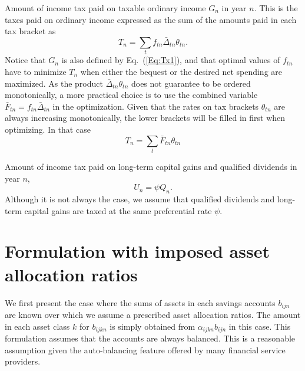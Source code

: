 \documentclass{report}[fleqn,11pt]
\begin{document}
\begin{description}[leftmargin=4em,style=multiline]
\item [$T_n$]
	Amount of income tax paid on taxable ordinary income $G_n$ in year $n$.
	This is the taxes paid on ordinary income expressed as the sum of the amounts
	paid in each tax bracket as
	\begin{equation}
		\label{Eq:IncTax0}
		T_n = \sum_t f_{tn}\bar{\Delta}_{tn}\theta_{tn}.
	\end{equation}
	Notice that $G_n$ is also defined by Eq.~(\ref{Eq:Tx1}), and that optimal
	values of $f_{tn}$ have to
	minimize $T_n$ when either the bequest or the desired net spending are maximized.
	As the product $\bar{\Delta}_{tn}\theta_{tn}$ does not guarantee to
	be ordered monotonically, a more practical choice is to use the combined variable
	$\bar{F}_{tn} = f_{tn}\bar{\Delta}_{tn}$ in the optimization. Given that the rates on
	tax brackets $\theta_{tn}$ are always increasing monotonically, the lower brackets
	will be filled in first when optimizing. In that case
	\begin{equation}
		\label{Eq:IncTax1}
		T_n = \sum_t \bar{F}_{tn} \theta_{tn}
	\end{equation}

\item [$U_n$]
	Amount of income tax paid on long-term capital gains and qualified dividends in year $n$,
	\begin{equation}
		U_n = \psi Q_n.
	\end{equation}
	Although it is not always the case, we assume that qualified dividends and long-term
	capital gains are taxed at the same preferential rate $\psi$.

\end{description}

\chapter{Formulation with imposed asset allocation ratios}
We first present the case where the sums of assets in each savings accounts $b_{ijn}$ are known
over which we assume a prescribed asset allocation ratios.
The amount in each asset class $k$ for $b_{ijkn}$ is simply obtained
from $\alpha_{ijkn} b_{ijn}$ in this case.
This formulation assumes that the accounts are always balanced. This is
a reasonable assumption given the auto-balancing feature offered by many financial service
providers.
\end{document}
